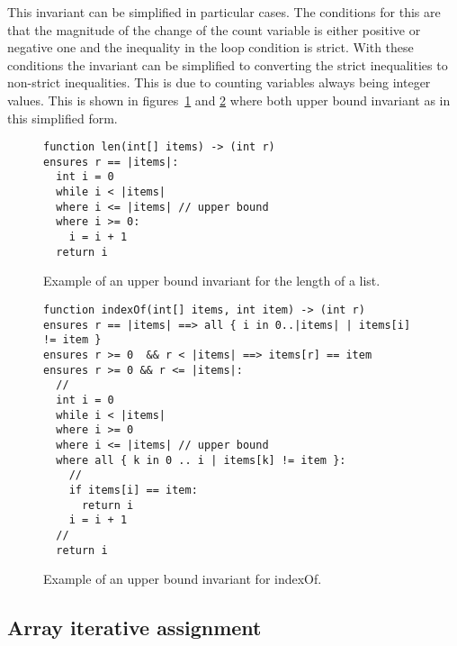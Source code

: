 This invariant can be simplified in particular cases.
The conditions for this are that the magnitude
of the change of the count variable is either positive or negative one
and the inequality in the loop condition is strict.
With these conditions the invariant can be simplified to converting the
strict inequalities to non-strict inequalities.
This is due to counting variables always being integer values.
This is shown in figures~\ref{lst:upper-bound} and
\ref{lst:upper-bound-indexof} where both upper bound
invariant as in this simplified form.

\begin{figure}[ht]
\begin{lstlisting}
function len(int[] items) -> (int r)
ensures r == |items|:
  int i = 0
  while i < |items|
  where i <= |items| // upper bound
  where i >= 0:
    i = i + 1
  return i
\end{lstlisting}
\caption{Example of an upper bound invariant for the length of a list.}
\label{lst:upper-bound}
\end{figure}

\begin{figure}[ht]
\begin{lstlisting}
function indexOf(int[] items, int item) -> (int r)
ensures r == |items| ==> all { i in 0..|items| | items[i] != item }
ensures r >= 0  && r < |items| ==> items[r] == item
ensures r >= 0 && r <= |items|:
  //
  int i = 0
  while i < |items|
  where i >= 0
  where i <= |items| // upper bound
  where all { k in 0 .. i | items[k] != item }:
    //    
    if items[i] == item:
      return i
    i = i + 1
  //
  return i
\end{lstlisting}
\caption{Example of an upper bound invariant for indexOf.}
\label{lst:upper-bound-indexof}
\end{figure}

\subsection{Array iterative assignment}

